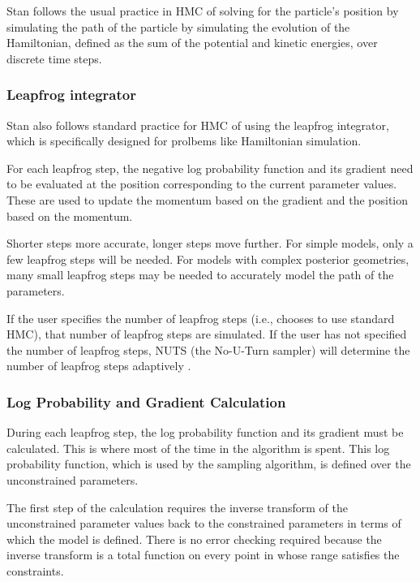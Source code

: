 \documentclass[article]{jss}
\begin{document}
Stan follows the usual practice in HMC of solving for the particle's
position by simulating the path of the particle by simulating the
evolution of the Hamiltonian, defined as the sum of the potential and
kinetic energies, over discrete time steps.  

\subsubsection{Leapfrog integrator}

Stan also follows standard practice for HMC of using the leapfrog
integrator, which is specifically designed for prolbems like
Hamiltonian simulation.

For each leapfrog step, the negative log probability function and its
gradient need to be evaluated at the position corresponding to the
current parameter values.  These are used to update the momentum based
on the gradient and the position based on the momentum.

Shorter steps more accurate, longer steps move further.  For simple
models, only a few leapfrog steps will be needed.  For models with
complex posterior geometries, many small leapfrog steps may be needed
to accurately model the path of the parameters.

If the user specifies the number of leapfrog steps (i.e., chooses to
use standard HMC), that number of leapfrog steps are simulated.  If
the user has not specified the number of leapfrog steps, NUTS (the No-U-Turn
sampler) will determine the number of leapfrog steps adaptively
\citep{Hoffman-Gelman:2011}.

\subsubsection{Log Probability and Gradient Calculation}

During each leapfrog step, the log probability function and its
gradient must be calculated.  This is where most of the time in the
 algorithm is spent.  This log probability function, which is
used by the sampling algorithm, is defined over the unconstrained
parameters.

The first step of the calculation requires the inverse transform of
the unconstrained parameter values back to the constrained parameters
in terms of which the model is defined.  There is no error checking
required because the inverse transform is a total function on every point
in whose range satisfies the constraints.
\end{document}
